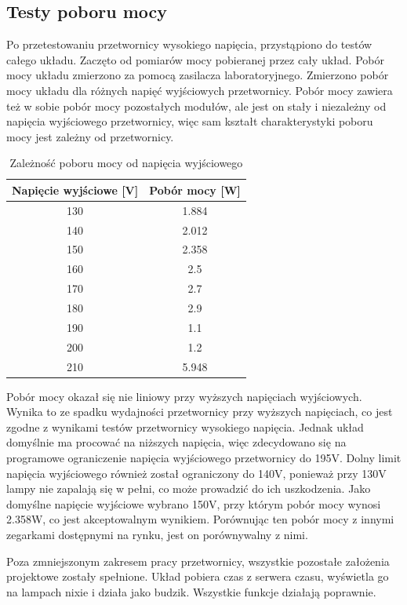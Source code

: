 \documentclass[../main.tex]{subfiles}
\begin{document}
\subsection{Testy poboru mocy}

Po przetestowaniu przetwornicy wysokiego napięcia, przystąpiono do testów całego układu.
Zaczęto od pomiarów mocy pobieranej przez cały układ. Pobór mocy układu zmierzono za pomocą zasilacza laboratoryjnego.
Zmierzono pobór mocy układu dla różnych napięć wyjściowych przetwornicy. Pobór mocy zawiera też w sobie pobór mocy pozostałych modułów,
ale jest on stały i niezależny od napięcia wyjściowego przetwornicy, więc sam kształt charakterystyki poboru mocy jest zależny od przetwornicy.

\begin{table}[H]
    \centering
    \begin{tabular}{|c|c|}
        \hline
        Napięcie wyjściowe [V] & Pobór mocy [W] \\
        \hline
        130 & 1.884 \\
        140 & 2.012 \\
        150 & 2.358 \\
        160 & 2.5 \\
        170 & 2.7 \\
        180 & 2.9 \\
        190 & 1.1 \\
        200 & 1.2 \\
        210 & 5.948 \\
        \hline
    \end{tabular}
    \caption{Zależność poboru mocy od napięcia wyjściowego}
\end{table}

Pobór mocy okazał się nie liniowy przy wyższych napięciach wyjściowych. Wynika to ze spadku wydajności przetwornicy przy wyższych napięciach,
co jest zgodne z wynikami testów przetwornicy wysokiego napięcia. Jednak układ domyślnie ma procować na niższych napięcia, więc 
zdecydowano się na programowe ograniczenie napięcia wyjściowego przetwornicy do 195V. Dolny limit napięcia wyjściowego również
został ograniczony do 140V, ponieważ przy 130V lampy nie zapalają się w pełni, co może prowadzić do ich uszkodzenia. 
Jako domyślne napięcie wyjściowe wybrano 150V, przy którym pobór mocy wynosi 2.358W, co jest akceptowalnym wynikiem.
Porównując ten pobór mocy z innymi zegarkami dostępnymi na rynku, jest on porównywalny z nimi.

Poza zmniejszonym zakresem pracy przetwornicy, wszystkie pozostałe założenia projektowe zostały spełnione. Układ 
pobiera czas z serwera czasu, wyświetla go na lampach nixie i działa jako budzik. Wszystkie funkcje działają poprawnie.
\end{document}
